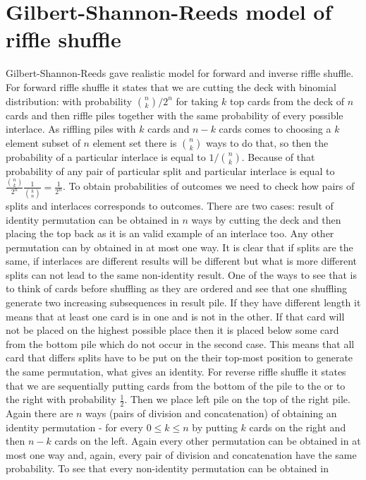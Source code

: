 \documentclass[a4paper, 12pt]{article}
\begin{document}
\section{Gilbert-Shannon-Reeds model of riffle shuffle}
Gilbert-Shannon-Reeds gave realistic model for forward and inverse riffle shuffle.
For forward riffle shuffle it states that we are cutting the deck with binomial distribution:
with probability $\binom{n}{k}/2^n$ for taking $k$ top cards from the deck of $n$ cards
and then riffle piles together with the same probability of every possible interlace. As riffling piles with
$k$ cards and $n-k$ cards comes to choosing a $k$ element subset of $n$ element set there is $\binom{n}{k}$
ways to do that, so then the probability of a particular interlace is equal to $1/\binom{n}{k}$.
Because of that probability of any pair of particular split and particular interlace is equal to
$\frac{\binom{n}{k}}{2^n}\frac{1}{\binom{k}{n}} = \frac{1}{2^n}$. To obtain probabilities of outcomes
we need to check how pairs of splits and interlaces corresponds to outcomes. There are two cases:
result of identity permutation can be obtained in $n$ ways by cutting the deck and then placing the top back
as it is an valid example of an interlace too. Any other permutation can by obtained in at most one way.
It is clear that if splits are the same, if interlaces are different results will be different but what is
more different splits can not lead to the same non-identity result. One of the ways to see that is to think
of cards before shuffling as they are ordered and see that one shuffling generate two increasing subsequences
in result pile. If they have different length it means that at least one card is in one and is not
in the other. If that card will not be placed on the highest possible place then it is placed below some
card from the bottom pile which do not occur in the second case. This means that all card that differs splits
have to be put on the their top-most position to generate the same permutation, what gives an identity.
For reverse riffle shuffle it states that we are sequentially putting cards from the bottom of the pile to
the or to the right with probability $\frac{1}{2}$. Then we place left pile on the top of the right pile.
Again there are $n$ ways (pairs of division and concatenation) of obtaining an identity permutation -
for every $0 \leq k \leq n$ by putting $k$ cards on the right and then $n-k$ cards on the left.
Again every other permutation can be obtained in at most one way and, again, every pair of division and
concatenation have the same probability. To see that every non-identity permutation can be obtained in
\end{document}
